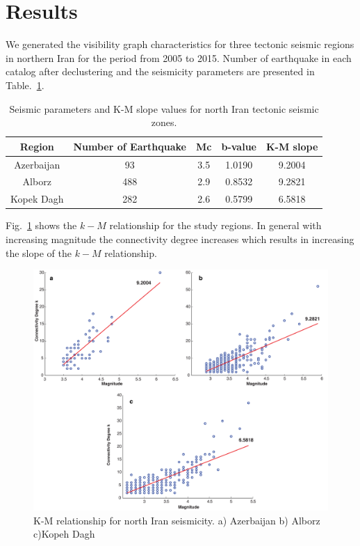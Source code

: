 
\section{Results}
\noindent
We generated the visibility graph characteristics for three tectonic seismic regions in northern Iran for the period from 2005 to 2015. Number of earthquake in each catalog after declustering and the seismicity parameters are presented in Table.~\ref{tab:b_k_m_param}. 


\begin{table}[h]
\centering
\caption{Seismic parameters and K-M slope values for north Iran tectonic seismic zones.}
\begin{tabular}{ccccc}
Region          & Number of Earthquake &  Mc &  b-value & K-M slope \\ \hline
Azerbaijan     & 93                                 & 3.5   & 1.0190  & 9.2004       \\ \hline
Alborz            & 488                               & 2.9   & 0.8532  & 9.2821      \\ \hline
Kopek Dagh  & 282                               & 2.6   & 0.5799  & 6.5818     \\ \hline
\end{tabular}
\label{tab:b_k_m_param}
\end{table}

\noindent
Fig.~\ref{fig:k_m_plot_m} shows the $k-M$ relationship for the study regions.  In general with increasing magnitude the connectivity degree increases which results in increasing the slope of the $k-M$ relationship. 

\begin{figure} [ht]
\centering
\includegraphics[scale=0.35]{figures/pdf/Figure05.pdf} 
\caption{ K-M relationship for north Iran seismicity. a) Azerbaijan b) Alborz c)Kopeh Dagh}
\label{fig:k_m_plot_m}
\end{figure}

